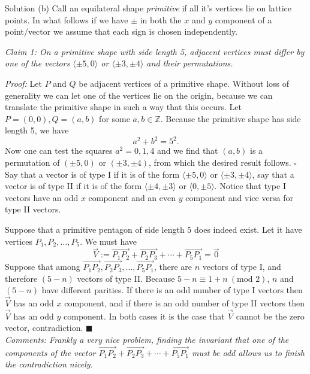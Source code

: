 \documentclass{article}
\begin{document}
\begin{solution}{Solution}
(b) Call an equilateral shape \textit{primitive} if all it's vertices lie
on lattice points. In what follows if we have $\pm$ in both the $x$ and $y$
component of a point/vector we assume that each sign is chosen
independently. \vspace{0.2cm}

\textit{Claim 1: On a primitive shape with side length 5, adjacent vertices
must differ by one of the vectors $\langle \pm 5,0\rangle$ or
$\langle \pm 3, \pm 4 \rangle$ and their permutations.}
\vspace{0.2cm}

\textit{Proof:} Let $P$ and $Q$ be adjacent vertices of a primitive shape.
Without loss of generality we can let one of the vertices
lie on the origin, because we can translate the primitive shape in such a
way that this occurs. Let $P = (0,0), Q = (a,b)$ for some
$a,b \in \mathbb{Z}$. Because the primitive shape has side length 5, we
have
$$
a^2 + b^2 = 5^2.
$$
Now one can test the squares $a^2 = 0,1,4$ and we find that $(a,b)$ is a
permutation of $(\pm 5, 0)$ or $(\pm 3, \pm 4)$, from which the desired
result follows. $\square$\\

Say that a vector is of type I if it is of the form
$\langle \pm 5, 0 \rangle$ or $\langle \pm 3, \pm 4\rangle$, say that a
vector is of type II if it is of the form $\langle \pm 4, \pm 3\rangle$ or
$\langle 0, \pm 5 \rangle$. Notice that type I vectors have an odd
$x$ component and an even $y$ component and vice versa for type II vectors.
\vspace{0.2cm}

Suppose that a primitive pentagon of side length 5 does indeed exist.
Let it have vertices $P_1, P_2,\ldots, P_5$. We must have
$$
\overrightarrow{V} := \overrightarrow{P_1 P_2} + \overrightarrow{P_2 P_3} + \cdots +
\overrightarrow{P_5 P_1} = \overrightarrow{0}
$$
Suppose that among $\overrightarrow{P_1 P_2}, \overrightarrow{P_2 P_3},
\ldots, \overrightarrow{P_5 P_1}$, there are $n$ vectors of type I, and
therefore $(5-n)$ vectors of type II. Because
$5-n \equiv 1 + n \ (\text{mod } 2)$, $n$ and $(5-n)$ have different
parities. If there is an odd number of type I vectors
then $\overrightarrow{V}$ has an odd $x$ component, and if there is an odd
number of type II vectors then $\overrightarrow{V}$ has an odd $y$
component. In both cases it is the case that $\overrightarrow{V}$ cannot be
the zero vector, contradiction. $\blacksquare$\\

\textit{Comments: Frankly a very nice problem, finding the invariant that
one of the components of the vector $\overrightarrow{P_1 P_2} +
\overrightarrow{P_2 P_3} + \cdots + \overrightarrow{P_5 P_1}$ must be odd
allows us to finish the contradiction nicely.}
\end{solution}
\newpage
\end{document}
